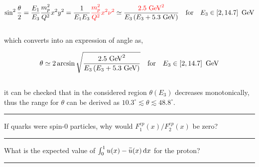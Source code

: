 \begin{solution}
\begin{enumerate}[label=(\alph*)]
            \begin{align*}
                \sin^2 \frac{\theta}{2} = \frac{E_1}{E_3} \frac{m_p^2}{Q^2} x^2 y^2 = \frac{1}{E_1E_3} {\color{red}\frac{m_p^2}{Q^2} x^2 \nu^2} \simeq \frac{\color{red} 2.5 \text{ GeV}^2}{E_3 \left( E_3 + 5.3 \text{ GeV} \right)}  \quad \text{for} \quad E_3 \in  \left[ 2,14.7 \right] \text{ GeV}
            \end{align*}\\
            which converts into an expression of angle as,

            \begin{align*}
                \theta \simeq 2 \arcsin \sqrt{\frac{2.5 \text{ GeV}^2}{E_3 \left( E_3 + 5.3 \text{ GeV} \right)}} \quad \text{for} \quad E_3 \in  \left[ 2,14.7 \right] \text{ GeV}
            \end{align*}\\
            it can be checked that in the considered region $\theta(E_3)$ decreases monotonically, thus the range for $\theta$ can be derived as $\boxed{  10.3^\circ \lesssim  \theta \lesssim  48.8^\circ }$.
    \end{enumerate}
\end{solution}

\noindent\rule{7in}{1.5pt}


\begin{problem}{8.4}
    If quarks were spin-0 particles, why would $F^{ep}_1(x)/F^{ep}_2(x)$ be zero?
\end{problem}
\begin{solution}

\end{solution}

\noindent\rule{7in}{1.5pt}


\begin{problem}{8.5}
    What is the expected value of $\int_0^1 u(x) - \overbar{u}(x) \dif x$ for the proton?
\end{problem}
\begin{solution}

\end{solution}

\noindent\rule{7in}{1.5pt}


